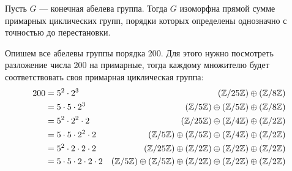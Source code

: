 \documentclass[../main.tex]{subfiles}
\begin{document}
\begin{theorem}
  Пусть $G$ --- конечная абелева группа. Тогда $G$ изоморфна прямой сумме примарных циклических групп, порядки которых определены однозначно с точностью до перестановки.
\end{theorem}
\begin{example}
  Опишем все абелевы группы порядка 200. Для этого нужно посмотреть разложение числа 200 на примарные, тогда каждому множителю будет соответствовать своя примарная циклическая группа:
  \begin{align*}
    200 &= 5^2 \cdot 2^3
        &(\mathbb{Z}/25\mathbb{Z}) \oplus (\mathbb{Z}/8\mathbb{Z})
        \\
        &= 5 \cdot 5 \cdot 2^3
        &(\mathbb{Z}/5\mathbb{Z}) \oplus (\mathbb{Z}/5\mathbb{Z}) \oplus (\mathbb{Z}/8\mathbb{Z})
        \\
        &= 5^2 \cdot 2^2 \cdot 2
        &(\mathbb{Z}/25\mathbb{Z}) \oplus (\mathbb{Z}/4\mathbb{Z}) \oplus (\mathbb{Z}/2\mathbb{Z})
        \\
        &= 5 \cdot 5 \cdot 2^2 \cdot 2
        &(\mathbb{Z}/5\mathbb{Z}) \oplus (\mathbb{Z}/5\mathbb{Z}) \oplus (\mathbb{Z}/4\mathbb{Z}) \oplus (\mathbb{Z}/2\mathbb{Z})
        \\
        &= 5^2 \cdot 2 \cdot 2 \cdot 2
        &(\mathbb{Z}/25\mathbb{Z}) \oplus (\mathbb{Z}/2\mathbb{Z}) \oplus (\mathbb{Z}/2\mathbb{Z}) \oplus (\mathbb{Z}/2\mathbb{Z})
        \\
        &= 5 \cdot 5 \cdot 2 \cdot 2 \cdot 2
        &(\mathbb{Z}/5\mathbb{Z}) \oplus (\mathbb{Z}/5\mathbb{Z}) \oplus (\mathbb{Z}/2\mathbb{Z}) \oplus (\mathbb{Z}/2\mathbb{Z}) \oplus (\mathbb{Z}/2\mathbb{Z})
  \end{align*}
\end{example}
\end{document}
